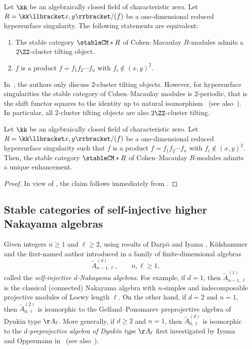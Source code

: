 \documentclass[a4paper]{amsart}
\begin{document}
\begin{theorem}
  \label{thm:BIKR}
  Let $\kk$ be an algebraically closed
  field of characteristic zero. Let $R=\kk\llbracket x,y\rrbracket/(f)$ be a
  one-dimensional reduced hypersurface singularity. The following statements are
  equivalent:
  \begin{enumerate}
  \item The stable category $\stableCM*{R}$ of Cohen--Macaulay $R$-modules
    admits a $2\ZZ$-cluster tilting object.
  \item $f$ is a product $f=f_1f_2\cdots f_n$ with $f_i\not\in (x,y)^2$.
  \end{enumerate}
\end{theorem}

\begin{remark}
  In~\cite{BIKR08}, the authors only discuss $2$-cluster tilting objects.
  However, for hypersurface singularities the stable category of Cohen--Macaulay
  modules is $2$-periodic, that is the shift functor squares to the identity up
  to natural isomorphism~\cite{Eis80} (see also~\cite[Sec.~1]{BIKR08}). In particular, all $2$-cluster tilting
  objects are also $2\ZZ$-cluster tilting.
\end{remark}

\begin{theorem}
  \label{thm:application_BIKR}
  Let $\kk$ be an algebraically closed
  field of characteristic zero. Let $R=\kk\llbracket x,y\rrbracket/(f)$ be a
  one-dimensional reduced hypersurface singularity such that $f$ is a product
  $f=f_1f_2\cdots f_n$ with $f_i\not\in (x,y)^2$. Then, the stable category
  $\stableCM*{R}$ of Cohen--Macaulay $R$-modules admits a unique enhancement.
\end{theorem}
\begin{proof}
  In view of , the claim follows immediately from .
\end{proof}

\subsection{Stable categories of self-injective higher Nakayama algebras}

Given integers $n\geq1$ and $\ell\geq2$, using results of Darp{\"o} and Iyama
\cite{DI20}, K{\"u}lshammer and the first-named author introduced in
\cite{JK19a} a family of finite-dimensional algebras
\[
  \widetilde{A}_{n-1,\ell}^{(d)},\qquad n,\ell\geq1,
\]
called the \emph{self-injective $d$-Nakayama algebras}. For example, if $d=1$,
then $\widetilde{A}_{n-1,\ell}^{(1)}$ is the classical (connected) Nakayama
algebra with $n$-simples and indecomposable projective modules of Loewy length
$\ell$. On the other hand, if $d=2$ and $n=1$, then
$\widetilde{A}_{0,\ell}^{(2)}$ is isomorphic to the Gelfand--Ponomarev
preprojective algebra of Dynkin type $\AA_{\ell}$. More generally, if $d\geq2$
and $n=1$, then $\widetilde{A}_{0,\ell}^{(d)}$ is isomorphic to the
\emph{$d$-preprojective algebra of Dynkin type $\AA_\ell$} first investigated by
Iyama and Oppermann in~\cite[Sec.~5]{IO11} (see also~\cite[6.3 and 6.5]{GKO13}).
\end{document}
